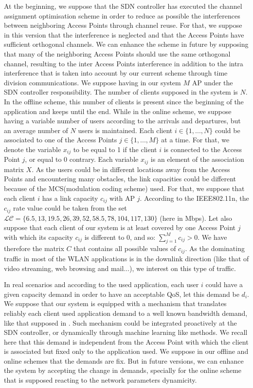\documentclass[journal,transmag]{IEEEtran}
\begin{document}
At the beginning, we suppose that the SDN controller has executed the channel assignment optimisation scheme in order to reduce as possible the interferences between neighboring Access Points through channel reuse. For that, we suppose in this version that the interference is neglected and that the Access Points have sufficient orthogonal channels. We can enhance the scheme in future by supposing that many of the neighboring Access Points should use the same orthogonal channel, resulting to the inter Access Points interference in addition to the intra interference that is taken into account by our current scheme through time division communications. We suppose having in our system $M$ AP under the SDN controller responsibility. The number of clients supposed in the system is $N$. In the offline scheme, this number of clients is present since the beginning of the application and keeps until the end. While in the online scheme, we suppose having a variable number of users according to the arrivals and departures, but an average number of $N$ users is maintained. Each client $i\in\{1,...,N\}$ could be associated to one of the Access Points $j\in\{1,...,M\}$ at a time. For that, we denote the variable $x_{ij}$ to be equal to 1 if the client $i$ is connected to the Access Point $j$, or equal to 0 contrary. Each variable $x_{ij}$ is an element of the association matrix $X$. As the users could be in different locations away from the Access Points and encountering many obstacles, the link capacities could be different because of the MCS(modulation coding scheme) used. For that, we suppose that each client $i$ has a link capacity $c_{ij}$ with AP $j$. According to the IEEE802.11n, the $c_{ij}$ rate value could be taken from the set $\mathscr{LC}=\{6.5, 13, 19.5, 26, 39, 52, 58.5, 78, 104, 117, 130\}$ (here in Mbps). Let also suppose that each client of our system is at least covered by one Access Point $j$ with which its capacity $c_{ij}$ is different to 0, and so: $\sum_{j=1}^{M}c_{ij}>0$. We have therefore the matrix $C$ that contains all possible values of $c_{ij}$. As the dominating traffic in most of the WLAN applications is in the downlink direction (like that of video streaming, web browsing and mail...), we interest on this type of traffic. 

In real scenarios and according to the used application, each user $i$ could have a given capacity demand in order to have an acceptable QoS, let this demand be $d_{i}$. We suppose that our system is equipped with a mechanism that translates reliably each client used application demand to a well known bandwidth demand, like that supposed in \cite{17QOS_AP_selection,16centralised_wifi_manegement}. Such mechanism could be integrated proactively at the SDN controller, or dynamically through machine learning like methods. We recall here that this demand is independent from the Access Point with which the client is associated but fixed only to the application used. We suppose in our offline and online schemes that the demands are fix. But in future versions, we can enhance the system by accepting the change in demands, specially for the online scheme that is supposed reacting to the network parameters dynamicity.
\end{document}
